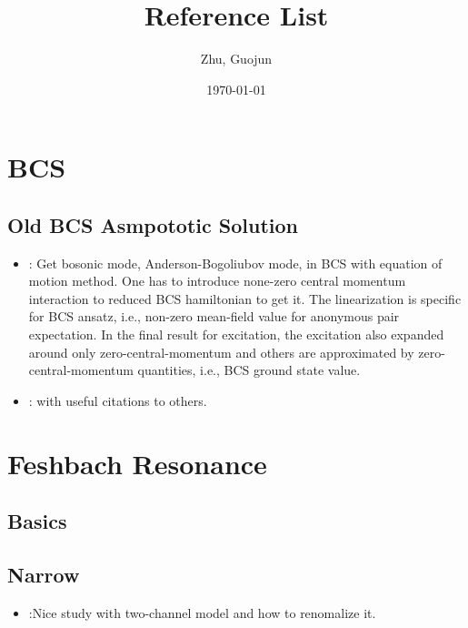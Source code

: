 \documentclass{article}
\title{Reference List}
\author{Zhu, Guojun}
\date{\today}
\begin{document}
\maketitle

\nocite{*}
\section{BCS}
\subsection{Old BCS Asmpototic Solution}
\begin{itemize}
  \item \cite{AndersonBCS}: Get bosonic mode, Anderson-Bogoliubov mode, in BCS with  equation of motion method.  One has to introduce none-zero central momentum interaction to reduced BCS hamiltonian to get it.  The linearization is specific for BCS ansatz, i.e., non-zero mean-field value for anonymous pair expectation. In the final result for excitation, the excitation also expanded around only zero-central-momentum and others are approximated by zero-central-momentum quantities, i.e., BCS ground state value. 
	\item \cite{BcsExact}: with useful citations to others.         
 \end{itemize}

\section{Feshbach Resonance}
\subsection{Basics}
\subsection{Narrow}
\begin{itemize}
  \item \cite{JacksonNarrow}:Nice study with two-channel model and how to renomalize it. 
	
 \end{itemize}





%
%
\end{document}
